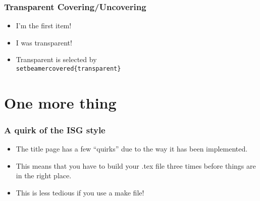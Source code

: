 \documentclass[]{beamer}
\begin{document}
\begin{frame}\frametitle{Transparent Covering/Uncovering}
\begin{itemize}
	\item I'm the first item!
	\pause
	\item I was transparent!
	\pause
	\item Transparent is selected by \texttt{\\setbeamercovered\{transparent\}}
\end{itemize}
\end{frame}

\section{One more thing}
\begin{frame}\frametitle{A quirk of the ISG style}
\begin{itemize}
	\item The title page has a few ``quirks'' due to the way it has been implemented.
	\item This means that you have to build your .tex file three times before things are in the right place.
	\item This is less tedious if you use a make file!
\end{itemize}
\end{frame}
\end{document}
